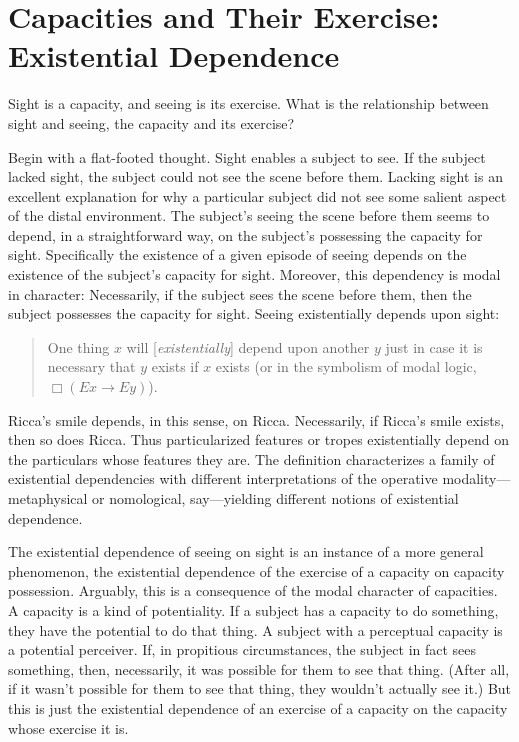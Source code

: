 \documentclass[12pt]{article}
\begin{document}
\section{Capacities and Their Exercise: Existential Dependence} %
\label{sec:capacities_and_their_exercise}

Sight is a capacity, and seeing is its exercise. What is the relationship between sight and seeing, the capacity and its exercise?

Begin with a flat-footed thought. Sight enables a subject to see. If the subject lacked sight, the subject could not see the scene before them. Lacking sight is an excellent explanation for why a particular subject did not see some salient aspect of the distal environment. The subject's seeing the scene before them seems to depend, in a straightforward way, on the subject's possessing the capacity for sight. Specifically the existence of a given episode of seeing depends on the existence of the subject's capacity for sight. Moreover, this dependency is modal in character: Necessarily, if the subject sees the scene before them, then the subject possesses the capacity for sight. Seeing existentially depends upon sight:
\begin{quote}
    One thing \( x \) will [\emph{existentially}] depend upon another \( y \) just in case it is necessary that \( y \) exists if \( x \) exists (or in the symbolism of modal logic, \( \Box(Ex \rightarrow Ey) \)). \citep[270]{Fine:1995ls} 
\end{quote}
Ricca's smile depends, in this sense, on Ricca. Necessarily, if Ricca's smile exists, then so does Ricca. Thus particularized features or tropes existentially depend on the particulars whose features they are. The definition characterizes a family of existential dependencies with different interpretations of the operative modality---metaphysical or nomological, say---yielding different notions of existential dependence. 

The existential dependence of seeing on sight is an instance of a more general phenomenon, the existential dependence of the exercise of a capacity on capacity possession. Arguably, this is a consequence of the modal character of capacities. A capacity is a kind of potentiality. If a subject has a capacity to do something, they have the potential to do that thing. A subject with a perceptual capacity is a potential perceiver. If, in propitious circumstances, the subject in fact sees something, then, necessarily, it was possible for them to see that thing. (After all, if it wasn't possible for them to see that thing, they wouldn't actually see it.) But this is just the existential dependence of an exercise of a capacity on the capacity whose exercise it is.
\end{document}
